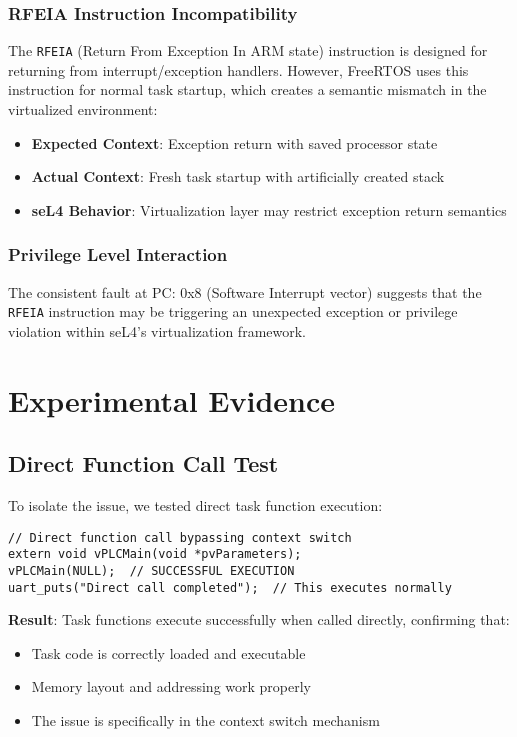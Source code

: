 \documentclass[11pt]{article}
\begin{document}
\subsubsection{RFEIA Instruction Incompatibility}
The \texttt{RFEIA} (Return From Exception In ARM state) instruction is designed for returning from interrupt/exception handlers. However, FreeRTOS uses this instruction for normal task startup, which creates a semantic mismatch in the virtualized environment:

\begin{itemize}
    \item \textbf{Expected Context}: Exception return with saved processor state
    \item \textbf{Actual Context}: Fresh task startup with artificially created stack
    \item \textbf{seL4 Behavior}: Virtualization layer may restrict exception return semantics
\end{itemize}

\subsubsection{Privilege Level Interaction}
The consistent fault at PC: 0x8 (Software Interrupt vector) suggests that the \texttt{RFEIA} instruction may be triggering an unexpected exception or privilege violation within seL4's virtualization framework.

\section{Experimental Evidence}

\subsection{Direct Function Call Test}
To isolate the issue, we tested direct task function execution:

\begin{lstlisting}[caption=Direct Task Execution Test]
// Direct function call bypassing context switch
extern void vPLCMain(void *pvParameters);
vPLCMain(NULL);  // SUCCESSFUL EXECUTION
uart_puts("Direct call completed");  // This executes normally
\end{lstlisting}

\textbf{Result}: Task functions execute successfully when called directly, confirming that:
\begin{itemize}
    \item Task code is correctly loaded and executable
    \item Memory layout and addressing work properly  
    \item The issue is specifically in the context switch mechanism
\end{itemize}
\end{document}
